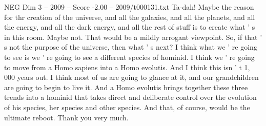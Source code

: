 \begin{textsample}{NEG Dim 3 – 2009 – Score -2.00 – 2009/t000131.txt}
Ta-dah!
Maybe the reason for thr creation of the universe, and all the galaxies, and all the planets, and all the energy, and all the dark energy, and all the rest of stuff is to create what ' s in this room.
Maybe not.
That would be a mildly arrogant viewpoint.
So, if that ' s not the purpose of the universe, then what ' s next?
I think what we ' re going to see is we ' re going to see a different species of hominid.
I think we ' re going to move from a Homo sapiens into a Homo evolutis.
And I think this isn ' t 1, 000 years out.
I think most of us are going to glance at it, and our grandchildren are going to begin to live it.
And a Homo evolutis brings together these three trends into a hominid that takes direct and deliberate control over the evolution of his species, her species and other species.
And that, of course, would be the ultimate reboot.
Thank you very much.

\end{textsample}
